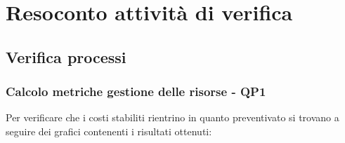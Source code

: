 \appendix
{}

\section{Resoconto attività di verifica}
	
\subsection{Verifica processi}

\subsubsection{Calcolo metriche gestione delle risorse - QP1}
Per verificare che i costi stabiliti rientrino in quanto preventivato si trovano a seguire dei grafici contenenti i risultati ottenuti:

